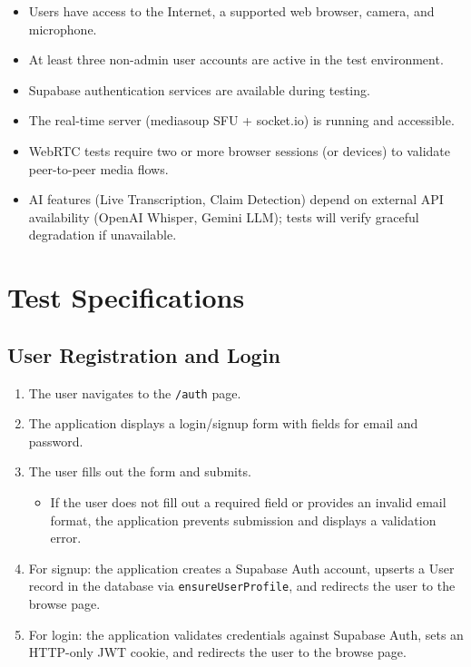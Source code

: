 \documentclass[12pt]{article}
\begin{document}
\begin{itemize}
    \item Users have access to the Internet, a supported web browser, camera, and microphone.
    \item At least three non-admin user accounts are active in the test environment.
    \item Supabase authentication services are available during testing.
    \item The real-time server (mediasoup SFU + socket.io) is running and accessible.
    \item WebRTC tests require two or more browser sessions (or devices) to validate peer-to-peer media flows.
    \item AI features (Live Transcription, Claim Detection) depend on external API availability (OpenAI Whisper, Gemini LLM); tests will verify graceful degradation if unavailable.
\end{itemize}

\newpage

\section{Test Specifications}

\subsection{User Registration and Login}

\begin{enumerate}
    \item The user navigates to the \texttt{/auth} page.
    \item The application displays a login/signup form with fields for email and password.
    \item The user fills out the form and submits.
    \begin{itemize}
        \item If the user does not fill out a required field or provides an invalid email format, the application prevents submission and displays a validation error.
    \end{itemize}
    \item For signup: the application creates a Supabase Auth account, upserts a User record in the database via \texttt{ensureUserProfile}, and redirects the user to the browse page.
    \item For login: the application validates credentials against Supabase Auth, sets an HTTP-only JWT cookie, and redirects the user to the browse page.
\end{enumerate}
\end{document}
